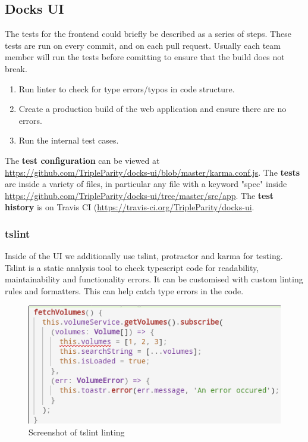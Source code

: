 \documentclass[]{article}
\begin{document}
\subsection{Docks UI}
The tests for the frontend could briefly be described as a series of steps.
These tests are run on every commit, and on each pull request. Usually each team
member will run the tests before comitting to ensure that the build does not break.

\begin{enumerate}
	\item Run linter to check for type errors/typos in code structure.
	\item Create a production build of the web application and ensure there are no errors.
	\item Run the internal test cases.
\end{enumerate}

The \textbf{test configuration} can be viewed at \url{https://github.com/TripleParity/docks-ui/blob/master/karma.conf.js}.
The \textbf{tests} are inside a variety of files, in particular any file with a keyword "spec"
inside \url{https://github.com/TripleParity/docks-ui/tree/master/src/app}.
The \textbf{test history} is on Travis CI (\url{https://travis-ci.org/TripleParity/docks-ui}.

\subsubsection{tslint}
Inside of the UI we additionally use tslint, protractor and karma for testing.
\\
Tslint is a static analysis tool to check typescript code for readability, maintainability and functionality errors.
It can be customised with custom linting rules and formatters.
This can help catch type errors in the code.
\begin{figure}[H]
	\centering
	\includegraphics[scale=0.5]{tslint_error.png}
	\caption{Screenshot of tslint linting}
\end{figure}
\end{document}
